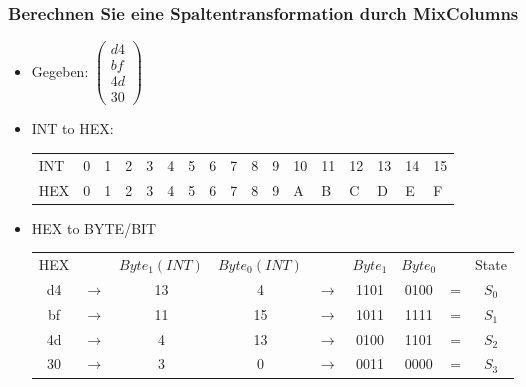  \subsubsection{Berechnen Sie eine Spaltentransformation durch MixColumns}
 \begin{itemize}
     \item Gegeben: $\begin{pmatrix}
                        d4\\
                        bf\\
                        4d\\
                        30
                    \end{pmatrix}$
     \item INT to HEX:
     \begin{center}
\begin{tabular}{lllllllllllllllll}
INT & 0 & 1 & 2 & 3 & 4 & 5 & 6 & 7 & 8 & 9 & 10 & 11 & 12 & 13 & 14 & 15\\
HEX & 0 & 1 & 2 & 3 & 4 & 5 & 6 & 7 & 8 & 9 & A & B & C & D & E & F
     \end{tabular}
     \end{center}

     \item HEX to BYTE/BIT
     \begin{center}
\begin{tabular}{ccccccccc}
HEX &  & $Byte_1 (INT)$ & $Byte_0 (INT)$ &  & $Byte_1$ & $Byte_0$ &  & State\\
d4 & $\rightarrow$ & 13 & 4 & $\rightarrow$ & 1101 & 0100 & = & $S_0$\\
bf & $\rightarrow$ & 11 & 15 & $\rightarrow$ & 1011 & 1111 & = & $S_1$\\
4d & $\rightarrow$ & 4 & 13 & $\rightarrow$ & 0100 & 1101 & = & $S_2$\\
30 & $\rightarrow$ & 3 & 0 & $\rightarrow$ & 0011 & 0000 & = & $S_3$
     \end{tabular}
     \end{center}


\end{itemize}
